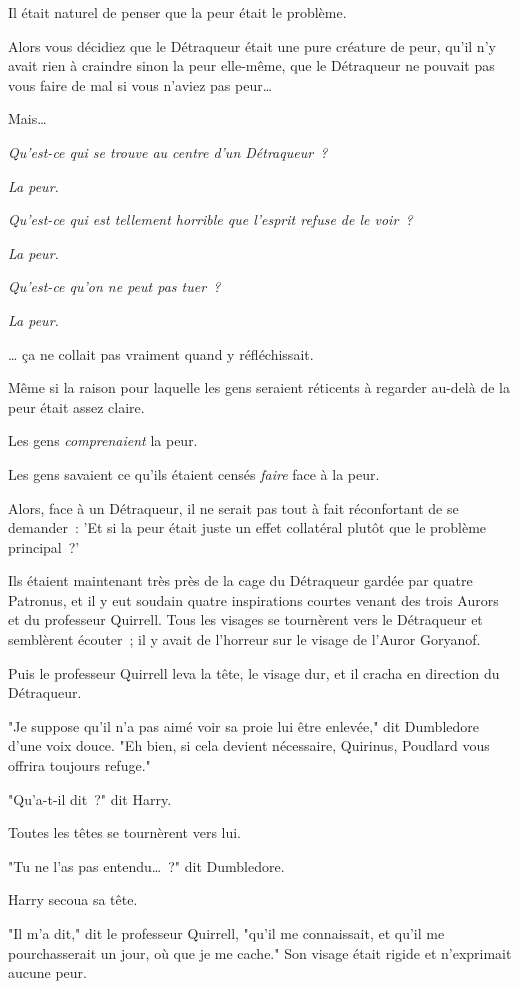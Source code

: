 Il était naturel de penser que la peur était le problème.

Alors vous décidiez que le Détraqueur était une pure créature de peur, qu'il n'y avait rien à craindre sinon la peur elle-même, que le Détraqueur ne pouvait pas vous faire de mal si vous n'aviez pas peur…

Mais…

\emph{Qu'est-ce qui se trouve au centre d'un Détraqueur~?}

\emph{La peur.}

\emph{Qu'est-ce qui est tellement horrible que l'esprit refuse de le voir~?}

\emph{La peur.}

\emph{Qu'est-ce qu'on ne peut pas tuer~?}

\emph{La peur.}

… ça ne collait pas vraiment quand y réfléchissait.

Même si la raison pour laquelle les gens seraient réticents à regarder au-delà de la peur était assez claire.

Les gens \emph{comprenaient} la peur.

Les gens savaient ce qu'ils étaient censés \emph{faire} face à la peur.

Alors, face à un Détraqueur, il ne serait pas tout à fait réconfortant de se demander~: 'Et si la peur était juste un effet collatéral plutôt que le problème principal~?'

Ils étaient maintenant très près de la cage du Détraqueur gardée par quatre Patronus, et il y eut soudain quatre inspirations courtes venant des trois Aurors et du professeur Quirrell. Tous les visages se tournèrent vers le Détraqueur et semblèrent écouter~; il y avait de l'horreur sur le visage de l'Auror Goryanof.

Puis le professeur Quirrell leva la tête, le visage dur, et il cracha en direction du Détraqueur.

"Je suppose qu'il n'a pas aimé voir sa proie lui être enlevée," dit Dumbledore d'une voix douce. "Eh bien, si cela devient nécessaire, Quirinus, Poudlard vous offrira toujours refuge."

"Qu'a-t-il dit~?" dit Harry.

Toutes les têtes se tournèrent vers lui.

"Tu ne l'as pas entendu…~?" dit Dumbledore.

Harry secoua sa tête.

"Il m'a dit," dit le professeur Quirrell, "qu'il me connaissait, et qu'il me pourchasserait un jour, où que je me cache." Son visage était rigide et n'exprimait aucune peur.

